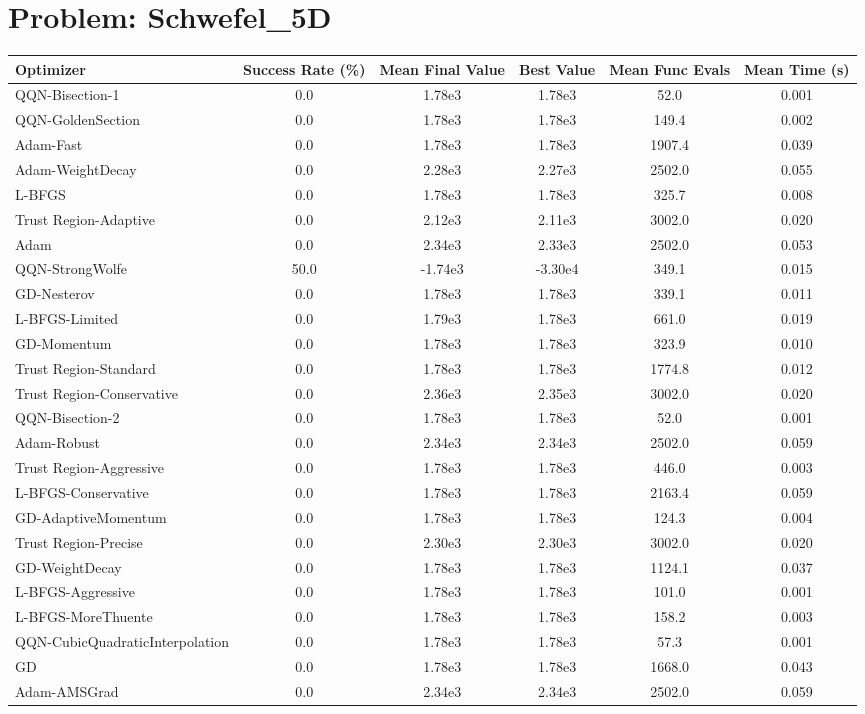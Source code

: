 \documentclass{article}
\begin{document}
\section{Problem: Schwefel\_5D}
\begin{longtable}{p{3cm}*{5}{c}}
\toprule
\textbf{Optimizer} & \textbf{Success Rate (\%)} & \textbf{Mean Final Value} & \textbf{Best Value} & \textbf{Mean Func Evals} & \textbf{Mean Time (s)} \\
\midrule
QQN-Bisection-1 & 0.0 & 1.78e3 & 1.78e3 & 52.0 & 0.001 \\
QQN-GoldenSection & 0.0 & 1.78e3 & 1.78e3 & 149.4 & 0.002 \\
Adam-Fast & 0.0 & 1.78e3 & 1.78e3 & 1907.4 & 0.039 \\
Adam-WeightDecay & 0.0 & 2.28e3 & 2.27e3 & 2502.0 & 0.055 \\
L-BFGS & 0.0 & 1.78e3 & 1.78e3 & 325.7 & 0.008 \\
Trust Region-Adaptive & 0.0 & 2.12e3 & 2.11e3 & 3002.0 & 0.020 \\
Adam & 0.0 & 2.34e3 & 2.33e3 & 2502.0 & 0.053 \\
QQN-StrongWolfe & 50.0 & -1.74e3 & -3.30e4 & 349.1 & 0.015 \\
GD-Nesterov & 0.0 & 1.78e3 & 1.78e3 & 339.1 & 0.011 \\
L-BFGS-Limited & 0.0 & 1.79e3 & 1.78e3 & 661.0 & 0.019 \\
GD-Momentum & 0.0 & 1.78e3 & 1.78e3 & 323.9 & 0.010 \\
Trust Region-Standard & 0.0 & 1.78e3 & 1.78e3 & 1774.8 & 0.012 \\
Trust Region-Conservative & 0.0 & 2.36e3 & 2.35e3 & 3002.0 & 0.020 \\
QQN-Bisection-2 & 0.0 & 1.78e3 & 1.78e3 & 52.0 & 0.001 \\
Adam-Robust & 0.0 & 2.34e3 & 2.34e3 & 2502.0 & 0.059 \\
Trust Region-Aggressive & 0.0 & 1.78e3 & 1.78e3 & 446.0 & 0.003 \\
L-BFGS-Conservative & 0.0 & 1.78e3 & 1.78e3 & 2163.4 & 0.059 \\
GD-AdaptiveMomentum & 0.0 & 1.78e3 & 1.78e3 & 124.3 & 0.004 \\
Trust Region-Precise & 0.0 & 2.30e3 & 2.30e3 & 3002.0 & 0.020 \\
GD-WeightDecay & 0.0 & 1.78e3 & 1.78e3 & 1124.1 & 0.037 \\
L-BFGS-Aggressive & 0.0 & 1.78e3 & 1.78e3 & 101.0 & 0.001 \\
L-BFGS-MoreThuente & 0.0 & 1.78e3 & 1.78e3 & 158.2 & 0.003 \\
QQN-CubicQuadraticInterpolation & 0.0 & 1.78e3 & 1.78e3 & 57.3 & 0.001 \\
GD & 0.0 & 1.78e3 & 1.78e3 & 1668.0 & 0.043 \\
Adam-AMSGrad & 0.0 & 2.34e3 & 2.34e3 & 2502.0 & 0.059 \\
\bottomrule
\end{longtable}
\end{document}

